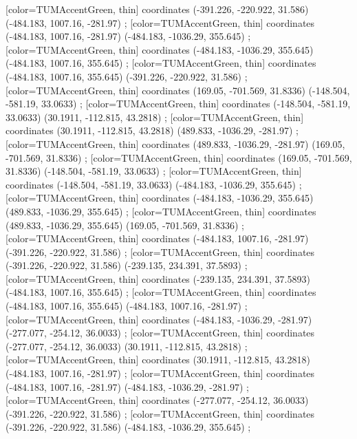         [color=TUMAccentGreen, thin] coordinates { (-391.226, -220.922, 31.586) (-484.183, 1007.16, -281.97) };
        [color=TUMAccentGreen, thin] coordinates { (-484.183, 1007.16, -281.97) (-484.183, -1036.29, 355.645) };
        [color=TUMAccentGreen, thin] coordinates { (-484.183, -1036.29, 355.645) (-484.183, 1007.16, 355.645) };
        [color=TUMAccentGreen, thin] coordinates { (-484.183, 1007.16, 355.645) (-391.226, -220.922, 31.586) };
        [color=TUMAccentGreen, thin] coordinates { (169.05, -701.569, 31.8336) (-148.504, -581.19, 33.0633) };
        [color=TUMAccentGreen, thin] coordinates { (-148.504, -581.19, 33.0633) (30.1911, -112.815, 43.2818) };
        [color=TUMAccentGreen, thin] coordinates { (30.1911, -112.815, 43.2818) (489.833, -1036.29, -281.97) };
        [color=TUMAccentGreen, thin] coordinates { (489.833, -1036.29, -281.97) (169.05, -701.569, 31.8336) };
        [color=TUMAccentGreen, thin] coordinates { (169.05, -701.569, 31.8336) (-148.504, -581.19, 33.0633) };
        [color=TUMAccentGreen, thin] coordinates { (-148.504, -581.19, 33.0633) (-484.183, -1036.29, 355.645) };
        [color=TUMAccentGreen, thin] coordinates { (-484.183, -1036.29, 355.645) (489.833, -1036.29, 355.645) };
        [color=TUMAccentGreen, thin] coordinates { (489.833, -1036.29, 355.645) (169.05, -701.569, 31.8336) };
        [color=TUMAccentGreen, thin] coordinates { (-484.183, 1007.16, -281.97) (-391.226, -220.922, 31.586) };
        [color=TUMAccentGreen, thin] coordinates { (-391.226, -220.922, 31.586) (-239.135, 234.391, 37.5893) };
        [color=TUMAccentGreen, thin] coordinates { (-239.135, 234.391, 37.5893) (-484.183, 1007.16, 355.645) };
        [color=TUMAccentGreen, thin] coordinates { (-484.183, 1007.16, 355.645) (-484.183, 1007.16, -281.97) };
        [color=TUMAccentGreen, thin] coordinates { (-484.183, -1036.29, -281.97) (-277.077, -254.12, 36.0033) };
        [color=TUMAccentGreen, thin] coordinates { (-277.077, -254.12, 36.0033) (30.1911, -112.815, 43.2818) };
        [color=TUMAccentGreen, thin] coordinates { (30.1911, -112.815, 43.2818) (-484.183, 1007.16, -281.97) };
        [color=TUMAccentGreen, thin] coordinates { (-484.183, 1007.16, -281.97) (-484.183, -1036.29, -281.97) };
        [color=TUMAccentGreen, thin] coordinates { (-277.077, -254.12, 36.0033) (-391.226, -220.922, 31.586) };
        [color=TUMAccentGreen, thin] coordinates { (-391.226, -220.922, 31.586) (-484.183, -1036.29, 355.645) };
